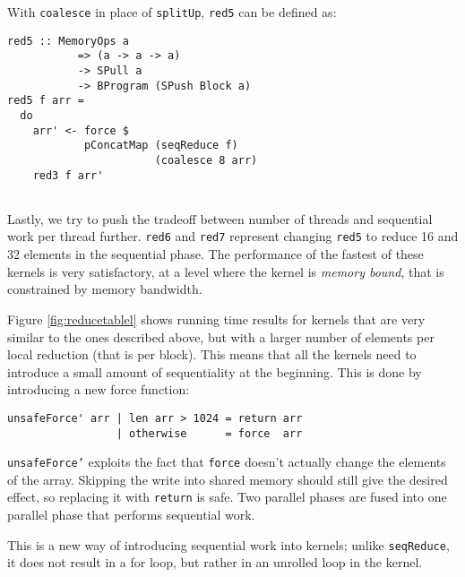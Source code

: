 \noindent
With {\tt coalesce} in place of {\tt splitUp}, {\tt red5} can be defined as: 

\begin{small} 
\begin{Verbatim}[samepage = true] 
red5 :: MemoryOps a
           => (a -> a -> a)
           -> SPull a
           -> BProgram (SPush Block a)
red5 f arr =
  do
    arr' <- force $  
            pConcatMap (seqReduce f)
                       (coalesce 8 arr)
    red3 f arr' 
  
\end{Verbatim}
\end{small}%


Lastly, we try to push the tradeoff between number of threads and sequential 
work per thread further. {\tt red6} and {\tt red7} represent  
changing {\tt red5} to reduce 16 and 32 elements in the sequential phase.
The performance of the fastest of these kernels is very satisfactory, at 
a level where the kernel is {\em memory bound}, that is constrained by 
memory bandwidth.

Figure \ref{fig:reducetablel} shows running time results for kernels that are 
very similar to the ones described above, but with a larger number 
of elements per local reduction (that is per block). This means that all the kernels need 
to introduce a small amount of sequentiality at the beginning. This is 
done by introducing a new force function:  

\begin{small}
\begin{Verbatim}[samepage=true] 
unsafeForce' arr | len arr > 1024 = return arr
                 | otherwise      = force  arr 
\end{Verbatim} 
\end{small}  

\noindent
{\tt unsafeForce'} exploits the fact that {\tt force} doesn't actually
change the elements of the array. 
Skipping the write into shared memory should still give the desired effect,
so replacing it with \verb!return! is safe. Two parallel phases are fused into one parallel phase that performs sequential work. 

This is a new way of introducing sequential work into kernels; unlike {\tt seqReduce}, it does not result in a for loop, but rather in an unrolled loop in the kernel.


